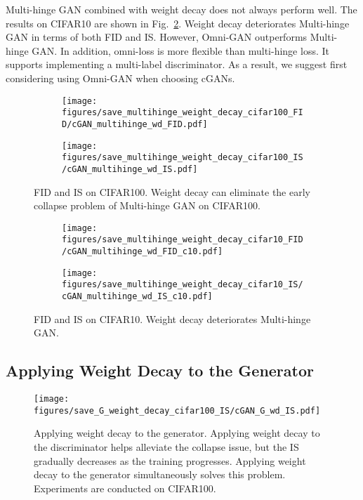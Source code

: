 \documentclass[paper_2425.tex]{subfiles}
\begin{document}
Multi-hinge GAN combined with weight decay does not always perform well. The results on CIFAR10 are shown in Fig.~\ref{apx:fig:multihinge_wd_c10}. Weight decay deteriorates Multi-hinge GAN in terms of both FID and IS. However, Omni-GAN outperforms Multi-hinge GAN. In addition, omni-loss is more flexible than multi-hinge loss. It supports implementing a multi-label discriminator. As a result, we suggest first considering using Omni-GAN when choosing cGANs.



\begin{figure}[t]
  \centering
  \begin{subfigure}{0.49\linewidth}
\texttt{[image: figures/save\_multihinge\_weight\_decay\_cifar100\_FID/cGAN\_multihinge\_wd\_FID.pdf]}
    \caption{}
  \end{subfigure}
  \begin{subfigure}{0.49\linewidth}
    \centering
    \texttt{[image: figures/save\_multihinge\_weight\_decay\_cifar100\_IS/cGAN\_multihinge\_wd\_IS.pdf]}
    \caption{}
  \end{subfigure}
  \caption{FID and IS on CIFAR100. Weight decay can eliminate the early collapse problem of Multi-hinge GAN on CIFAR100.}
  \label{apx:fig:multihinge_wd_c100}
\end{figure}

\begin{figure}[t]
  \begin{subfigure}{0.49\linewidth}
    \centering
\texttt{[image: figures/save\_multihinge\_weight\_decay\_cifar10\_FID/cGAN\_multihinge\_wd\_FID\_c10.pdf]}
\caption{}
\end{subfigure}
  \begin{subfigure}{0.49\linewidth}
    \centering
\texttt{[image: figures/save\_multihinge\_weight\_decay\_cifar10\_IS/cGAN\_multihinge\_wd\_IS\_c10.pdf]}
\caption{}
\end{subfigure}
  \caption{FID and IS on CIFAR10. Weight decay deteriorates Multi-hinge GAN.}
  \label{apx:fig:multihinge_wd_c10}
\end{figure}

\subsection{Applying Weight Decay to the Generator}
\label{apx:sec:weight_decay_generator}

\begin{figure}[t]
  \centering
  \centering
  \texttt{[image: figures/save\_G\_weight\_decay\_cifar100\_IS/cGAN\_G\_wd\_IS.pdf]}
  \caption{Applying weight decay to the generator. Applying weight decay to the discriminator helps alleviate the collapse issue, but the IS gradually decreases as the training progresses. Applying weight decay to the generator simultaneously solves this problem. Experiments are conducted on CIFAR100.}
  \label{apx:fig:generator_wd}
\end{figure}
\end{document}
